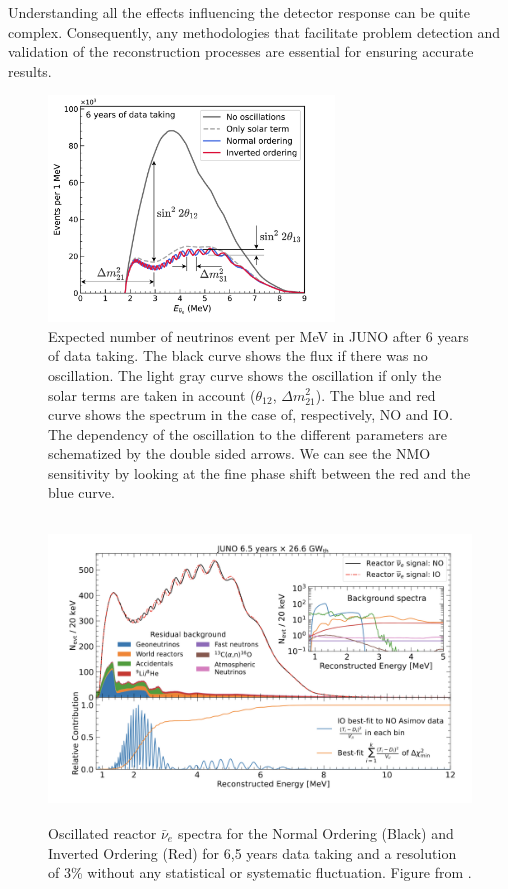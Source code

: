 \documentclass[../main.tex]{subfiles}
\begin{document}
Understanding all the effects influencing the detector response can be quite complex. Consequently, any methodologies that facilitate problem detection and validation of the reconstruction processes are essential for ensuring accurate results.

\begin{figure}[ht]
\centering
  \centering
  \includegraphics[height=6cm]{images/juno/Spectrum-OscillationsOnly_dm2_31.png}
  \caption{Expected number of neutrinos event per MeV in JUNO after 6 years of data taking. The black curve shows the flux if there was no oscillation. The light gray curve shows the oscillation if only the solar terms are taken in account ($\theta_{12}$, $\Delta m_{21}^2$). The blue and red curve shows the spectrum in the case of, respectively, NO and IO. The dependency of the oscillation to the different parameters are schematized by the double sided arrows. We can see the NMO sensitivity by looking at the fine phase shift between the red and the blue curve.}
  \label{fig:joint_fit:juno-spectrum-oscillation}
\end{figure}
\begin{figure}[ht]
  \centering
  \includegraphics[height=8cm]{images/joint_fit/mass_ordering.png}
  \caption{Oscillated reactor $\bar{\nu}_e$ spectra for the Normal Ordering (Black) and Inverted Ordering (Red) for 6,5 years data taking and a resolution of 3\% without any statistical or systematic fluctuation. Figure from \cite{abusleme_potential_2024}.}
  \label{fig:joint_fit:juno-ordering}
\end{figure}
\end{document}
